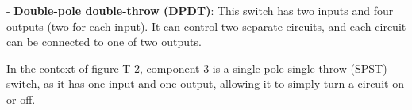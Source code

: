 - \textbf{Double-pole double-throw (DPDT)}: This switch has two inputs and four outputs (two for each input). It can control two separate circuits, and each circuit can be connected to one of two outputs.

In the context of figure T-2, component 3 is a single-pole single-throw (SPST) switch, as it has one input and one output, allowing it to simply turn a circuit on or off.

